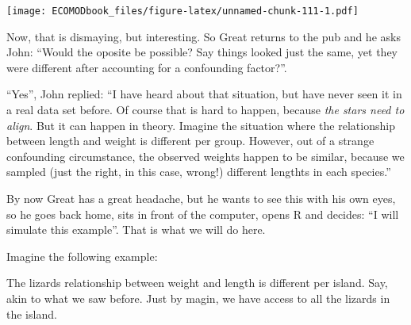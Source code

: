 \documentclass[
]{book}
\begin{document}
\texttt{[image: ECOMODbook\_files/figure-latex/unnamed-chunk-111-1.pdf]}

Now, that is dismaying, but interesting. So Great returns to the pub and he asks John: ``Would the oposite be possible? Say things looked just the same, yet they were different after accounting for a confounding factor?''.

``Yes'', John replied: ``I have heard about that situation, but have never seen it in a real data set before. Of course that is hard to happen, because \emph{the stars need to align}. But it can happen in theory. Imagine the situation where the relationship between length and weight is different per group. However, out of a strange confounding circumstance, the observed weights happen to be similar, because we sampled (just the right, in this case, wrong!) different lengthts in each species.''

By now Great has a great headache, but he wants to see this with his own eyes, so he goes back home, sits in front of the computer, opens R and decides: ``I will simulate this example''. That is what we will do here.

Imagine the following example:

The lizards relationship between weight and length is different per island. Say, akin to what we saw before. Just by magin, we have access to all the lizards in the island.
\end{document}
